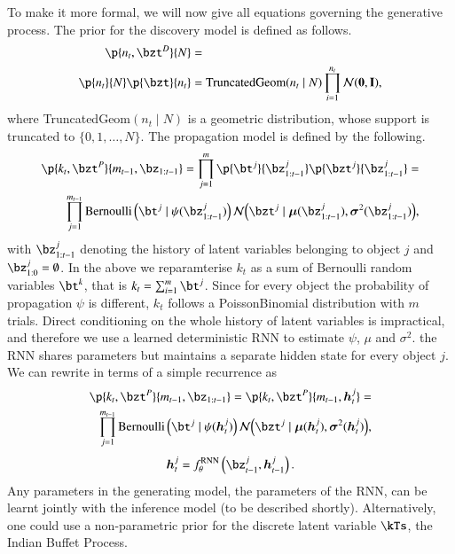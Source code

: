 To make it more formal, we will now give all equations governing the generative process. The prior for the discovery model is defined as follows.
\begin{equation}
\begin{aligned}
    \p{n_t, \bzt^D}{N} &=\\
    \p{n_t}{N} \p{\bzt}{n_t} &= \mathrm{TruncatedGeom} (n_t \mid N) \prod_{i=1}^{n_t} \gauss{\bf{0}, I},
\end{aligned}
\end{equation}
where TruncatedGeom$(n_t \mid N)$ is a geometric distribution, whose support is truncated to $\{0, 1, \dots, N\}$. The propagation model is defined by the following.
\begin{equation}
\begin{aligned}
    \p{k_t, \bzt^P}{m_{t-1}, \bz_{1:t-1}} = \prod_{j=1}^m \p{\bt^j}{\bz_{1:t-1}^j} \p{\bzt^j}{\bz_{1:t-1}^j} =\\
    \prod_{j=1}^{m_{t-1}} \mathrm{Bernoulli} \left(\bt^j \mid \psi( \bz_{1:t-1}^j) \right) \gauss{\bzt^j \mid \bm{\mu} (\bz_{1:t-1}^j), \bm{\sigma}^2(\bz_{1:t-1}^j)},
\end{aligned}
\label{eq:prop_prior}
\end{equation}
with $\bz_{1:t-1}^j$ denoting the history of latent variables belonging to object $j$ and $\bz_{1:0}^j = \emptyset$. In the above we reparamterise $k_t$ as a sum of Bernoulli random variables $\bt^k$, that is $k_t = \sum_{i=1}^m \bt^j$. Since for every object the probability of propagation $\psi$ is different, $k_t$ follows a PoissonBinomial distribution with $m$ trials. Direct conditioning on the whole history of latent variables is impractical, and therefore we use a learned deterministic RNN to estimate $\psi$, $\mu$ and $\sigma^2$. the RNN shares parameters but maintains a separate hidden state for every object $j$. We can rewrite  in terms of a simple recurrence as
\begin{equation}
\begin{aligned}
    \p{k_t, \bzt^P}{m_{t-1}, \bz_{1:t-1}} = \p{k_t, \bzt^P}{m_{t-1}, \bm{h}_t^j} =\\
    \prod_{j=1}^{m_{t-1}} \mathrm{Bernoulli} \left(\bt^j \mid \psi( \bm{h}_t^j ) \right) \gauss{\bzt^j \mid \bm{\mu} (\bm{h}_t^j), \bm{\sigma}^2(\bm{h}_t^j)},
\end{aligned}
\end{equation}
\begin{equation}
    \bm{h}_t^j = f^{\mathrm{RNN}}_\theta \left( \bz_{t-1}^j, \bm{h}_{t-1}^j \right).
\end{equation}
Any parameters in the generating model, \eg the parameters of the RNN, can be learnt jointly with the inference model (to be described shortly).
Alternatively, one could use a non-parametric prior for the discrete latent variable $\kTs$, \eg the Indian Buffet Process. 


